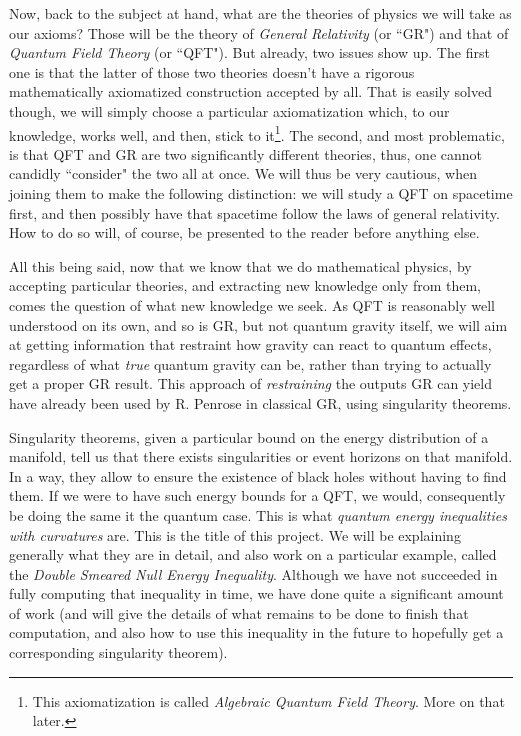\documentclass[a4paper,11pt]{article}
\numberwithin{equation}{section}
\theoremstyle{definition}
\begin{document}
Now, back to the subject at hand, what are the theories of physics we will take as our axioms? Those will be the theory of \textit{General Relativity} (or ``GR") and that of \textit{Quantum Field Theory} (or ``QFT"). But already, two issues show up. The first one is that the latter of those two theories doesn't have a rigorous mathematically axiomatized construction accepted by all. That is easily solved though, we will simply choose a particular axiomatization which, to our knowledge, works well, and then, stick to it\footnote{This axiomatization is called \textit{Algebraic Quantum Field Theory}. More on that later.}. The second, and most problematic, is that QFT and GR are two significantly different theories, thus, one cannot candidly ``consider" the two all at once. We will thus be very cautious, when joining them to make the following distinction: we will study a QFT on spacetime first, and then possibly have that spacetime follow the laws of general relativity. How to do so will, of course, be presented to the reader before anything else.

All this being said, now that we know that we do mathematical physics, by accepting particular theories, and extracting new knowledge only from them, comes the question of what new knowledge we seek. As QFT is reasonably well understood on its own, and so is GR, but not quantum gravity itself, we will aim at getting information that restraint how gravity can react to quantum effects, regardless of what \textit{true} quantum gravity can be, rather than trying to actually get a proper GR result. This approach of \textit{restraining} the outputs GR can yield have already been used by R. Penrose in classical GR, using singularity theorems. 

Singularity theorems, given a particular bound on the energy distribution of a manifold, tell us that there exists singularities or event horizons on that manifold. In a way, they allow to ensure the existence of black holes without having to find them. If we were to have such energy bounds for a QFT, we would, consequently be doing the same it the quantum case. This is what \textit{quantum energy inequalities with curvatures} are. This is the title of this project. We will be explaining generally what they are in detail, and also work on a particular example, called the \textit{Double Smeared Null Energy Inequality}. Although we have not succeeded in fully computing that inequality in time, we have done quite a significant amount of work (and will give the details of what remains to be done to finish that computation, and also how to use this inequality in the future to hopefully get a corresponding singularity theorem).
\end{document}
